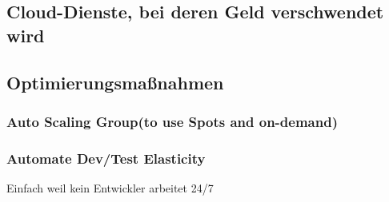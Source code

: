 \paragraph{}

\subsection{Cloud-Dienste, bei deren Geld verschwendet wird}


\subsection{Optimierungsmaßnahmen}

\subsubsection{Auto Scaling Group(to use Spots and on-demand)}

\subsubsection{Automate Dev/Test Elasticity}
Einfach weil kein Entwickler arbeitet 24/7





  